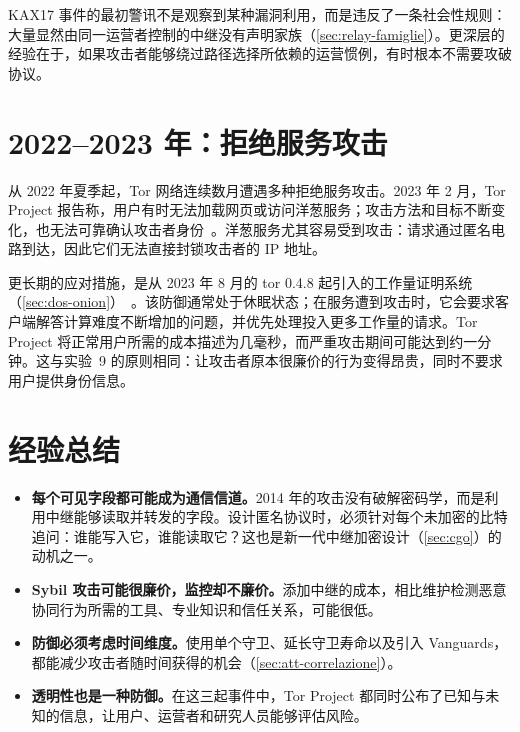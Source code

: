 \begin{approfondimento}[没有声明家族的中继]
KAX17 事件的最初警讯不是观察到某种漏洞利用，而是违反了一条社会性规则：大量显然由同一运营者控制的中继没有声明家族（\cref{sec:relay-famiglie}）。更深层的经验在于，如果攻击者能够绕过路径选择所依赖的运营惯例，有时根本不需要攻破协议。
\end{approfondimento}

\section{2022--2023 年：拒绝服务攻击}\label{sec:casi-dos}

从 2022 年夏季起，Tor 网络连续数月遭遇多种拒绝服务攻击。2023 年 2 月，Tor Project 报告称，用户有时无法加载网页或访问洋葱服务；攻击方法和目标不断变化，也无法可靠确认攻击者身份~\cite{torblog2023dos}。洋葱服务尤其容易受到攻击：请求通过匿名电路到达，因此它们无法直接封锁攻击者的 IP 地址。

更长期的应对措施，是从 2023 年 8 月的 tor 0.4.8 起引入的工作量证明系统（\cref{sec:dos-onion}）~\cite{torblog2023pow}。该防御通常处于休眠状态；在服务遭到攻击时，它会要求客户端解答计算难度不断增加的问题，并优先处理投入更多工作量的请求。Tor Project 将正常用户所需的成本描述为几毫秒，而严重攻击期间可能达到约一分钟。这与实验~9 的原则相同：让攻击者原本很廉价的行为变得昂贵，同时不要求用户提供身份信息。

\section{经验总结}\label{sec:casi-lezioni}

\begin{itemize}
  \item \textbf{每个可见字段都可能成为通信信道。}2014 年的攻击没有破解密码学，而是利用中继能够读取并转发的字段。设计匿名协议时，必须针对每个未加密的比特追问：谁能写入它，谁能读取它？这也是新一代中继加密设计（\cref{sec:cgo}）的动机之一。
  \item \textbf{Sybil 攻击可能很廉价，监控却不廉价。}添加中继的成本，相比维护检测恶意协同行为所需的工具、专业知识和信任关系，可能很低。
  \item \textbf{防御必须考虑时间维度。}使用单个守卫、延长守卫寿命以及引入 Vanguards，都能减少攻击者随时间获得的机会（\cref{sec:att-correlazione}）。
  \item \textbf{透明性也是一种防御。}在这三起事件中，Tor Project 都同时公布了已知与未知的信息，让用户、运营者和研究人员能够评估风险。
\end{itemize}


